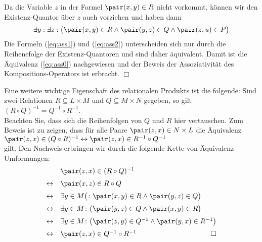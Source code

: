 Da die Variable $z$ in der Formel $\pair(x,y) \in R$ nicht vorkommt, können wir den
Existenz-Quantor über $z$ auch vorziehen und haben dann
\begin{equation}
  \label{eq:ass2}
  \exists y: \exists z: \bigl(\pair(x,y) \in R \wedge \pair(y,z) \in Q \wedge \pair(z,u) \in P\bigr)
\end{equation}
Die Formeln (\ref{eq:ass1}) und (\ref{eq:ass2}) unterscheiden sich nur durch die
Reihenefolge der Existenz-Quantoren und sind daher äquivalent.  Damit ist die Äquivalenz
(\ref{eq:ass0}) nachgewiesen und der Beweis der Assoziativität des Kompositions-Operators
ist erbracht.  \hspace*{\fill} $\Box$

Eine weitere wichtige Eigenschaft des relationalen Produkts ist die folgende: Sind
zwei Relationen $R \subseteq L \times M$ und $Q \subseteq M \times N$ gegeben, so gilt \\[0.2cm]
\hspace*{1.3cm} $(R \circ Q)^{-1} = Q^{-1} \circ R^{-1}$. \\[0.2cm]
Beachten Sie, dass sich die Reihenfolgen von $Q$ und $R$ hier vertauschen.  Zum Beweis
ist zu zeigen, dass für alle Paare $\pair(z,x) \in N \times L$ die  Äquivalenz \\[0.2cm]
\hspace*{1.3cm} $\pair(z,x) \in (Q \circ R)^{-1} \leftrightarrow \pair(z,x) \in R^{-1} \circ Q^{-1}$ \\[0.2cm]
gilt.  Den Nachweis erbringen wir durch die folgende Kette von Äquivalenz-Umformungen: 
\[ 
\begin{array}{cl}
                & \pair(z,x) \in (R \circ Q)^{-1}                                             \\[0.2cm]
\leftrightarrow & \pair(x,z) \in R \circ Q                                                    \\[0.2cm]
\leftrightarrow & \exists y \in M \bigl(\colon \pair(x,y) \in R \wedge \pair(y,z) \in Q\bigr) \\[0.2cm]
\leftrightarrow & \exists y \in M \colon \bigl(\pair(y,z) \in Q \wedge \pair(x,y) \in R\bigr) \\[0.2cm]
\leftrightarrow & \exists y \in M \colon \bigl(\pair(z,y) \in Q^{-1} \wedge \pair(y,x) \in R^{-1}\bigr) 
                  \\[0.2cm]
\leftrightarrow & \pair(z,x) \in Q^{-1} \circ R^{-1}   \hspace*{\fill} \Box                                       
\end{array}
\]
\vspace{0.2cm}

